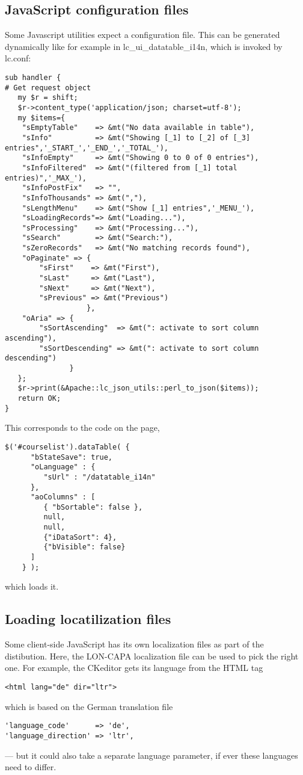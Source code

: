 \subsection{JavaScript configuration files}
Some Javascript utilities expect a configuration file. This can be generated dynamically like for example in lc\_ui\_datatable\_i14n, which is invoked by lc.conf:
\begin{verbatim}
sub handler {
# Get request object
   my $r = shift;
   $r->content_type('application/json; charset=utf-8');
   my $items={
    "sEmptyTable"    => &mt("No data available in table"),
    "sInfo"          => &mt("Showing [_1] to [_2] of [_3] entries",'_START_','_END_','_TOTAL_'),
    "sInfoEmpty"     => &mt("Showing 0 to 0 of 0 entries"),
    "sInfoFiltered"  => &mt("(filtered from [_1] total entries)",'_MAX_'),
    "sInfoPostFix"   => "",
    "sInfoThousands" => &mt(","),
    "sLengthMenu"    => &mt("Show [_1] entries",'_MENU_'),
    "sLoadingRecords"=> &mt("Loading..."),
    "sProcessing"    => &mt("Processing..."),
    "sSearch"        => &mt("Search:"),
    "sZeroRecords"   => &mt("No matching records found"),
    "oPaginate" => {
        "sFirst"    => &mt("First"),
        "sLast"     => &mt("Last"),
        "sNext"     => &mt("Next"),
        "sPrevious" => &mt("Previous")
                   },
    "oAria" => {
        "sSortAscending"  => &mt(": activate to sort column ascending"),
        "sSortDescending" => &mt(": activate to sort column descending")
               }
   };
   $r->print(&Apache::lc_json_utils::perl_to_json($items));
   return OK;
}
\end{verbatim}
This corresponds to the code on the page,
\begin{verbatim}
$('#courselist').dataTable( {
      "bStateSave": true,
      "oLanguage" : {
         "sUrl" : "/datatable_i14n"
      },
      "aoColumns" : [
         { "bSortable": false },
         null,
         null,
         {"iDataSort": 4},
         {"bVisible": false}
      ]
    } );
\end{verbatim}
which loads it.
\subsection{Loading locatilization files}
Some client-side JavaScript has its own localization files as part of the distibution. Here, the LON-CAPA localization file can be used to pick the right one. For example, the CKeditor gets its language from the HTML tag
\begin{verbatim}
<html lang="de" dir="ltr">
\end{verbatim}
which is based on the German translation file
\begin{verbatim}
'language_code'      => 'de',
'language_direction' => 'ltr',
\end{verbatim}
--- but it could also take a separate language parameter, if ever these languages need to differ.

